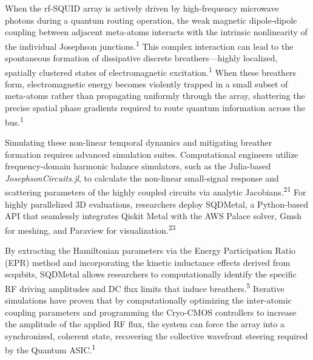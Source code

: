 \documentclass[11pt, a4paper]{article}
\begin{document}
When the rf-SQUID array is actively driven by high-frequency microwave photons during a quantum routing operation, the weak magnetic dipole-dipole coupling between adjacent meta-atoms interacts with the intrinsic nonlinearity of the individual Josephson junctions.\textsuperscript{1} This complex interaction can lead to the spontaneous formation of dissipative discrete breathers---highly localized, spatially clustered states of electromagnetic excitation.\textsuperscript{1} When these breathers form, electromagnetic energy becomes violently trapped in a small subset of meta-atoms rather than propagating uniformly through the array, shattering the precise spatial phase gradients required to route quantum information across the bus.\textsuperscript{1}

Simulating these non-linear temporal dynamics and mitigating breather formation requires advanced simulation suites. Computational engineers utilize frequency-domain harmonic balance simulators, such as the Julia-based \textit{JosephsonCircuits.jl}, to calculate the non-linear small-signal response and scattering parameters of the highly coupled circuits via analytic Jacobians.\textsuperscript{21} For highly parallelized 3D evaluations, researchers deploy SQDMetal, a Python-based API that seamlessly integrates Qiskit Metal with the AWS Palace solver, Gmsh for meshing, and Paraview for visualization.\textsuperscript{23}

By extracting the Hamiltonian parameters via the Energy Participation Ratio (EPR) method and incorporating the kinetic inductance effects derived from scqubits, SQDMetal allows researchers to computationally identify the specific RF driving amplitudes and DC flux limits that induce breathers.\textsuperscript{5} Iterative simulations have proven that by computationally optimizing the inter-atomic coupling parameters and programming the Cryo-CMOS controllers to increase the amplitude of the applied RF flux, the system can force the array into a synchronized, coherent state, recovering the collective wavefront steering required by the Quantum ASIC.\textsuperscript{1}
\end{document}
